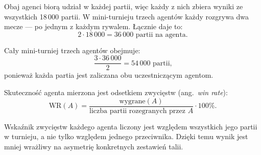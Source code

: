 Obaj agenci biorą udział w każdej partii, więc każdy z nich zbiera wyniki ze wszystkich 18\,000 partii. W mini-turnieju trzech agentów każdy rozgrywa dwa mecze --- po jednym z każdym rywalem. Łącznie daje to:
\begin{equation}
    2 \cdot 18\,000 = 36\,000 \text{ partii na agenta.}
    \label{eq:games_per_agent_minitournament}
\end{equation}

Cały mini-turniej trzech agentów obejmuje:
\begin{equation}
    \frac{3 \cdot 36\,000}{2} = 54\,000 \text{ partii,}
    \label{eq:games_per_minitournament}
\end{equation}
ponieważ każda partia jest zaliczana obu uczestniczącym agentom.

Skuteczność agenta mierzona jest odsetkiem zwycięstw (ang.~\textit{win rate}):
\begin{equation}
    \text{WR}(A) = \frac{\text{wygrane}(A)}{\text{liczba partii rozegranych przez } A} \cdot 100\%.
    \label{eq:winrate}
\end{equation}

Wskaźnik zwycięstw każdego agenta liczony jest względem wszystkich jego partii w turnieju, a nie tylko względem jednego przeciwnika. Dzięki temu wynik jest mniej wrażliwy na asymetrię konkretnych zestawień talii.
